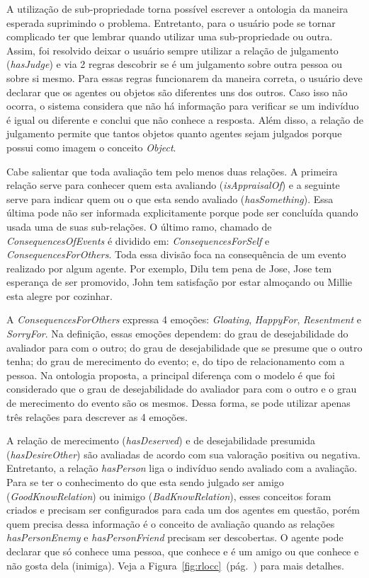 A utilização de sub-propriedade torna possível escrever a ontologia da maneira
esperada suprimindo o problema. Entretanto, para o usuário pode se tornar
complicado ter que lembrar quando utilizar uma sub-propriedade ou outra.
Assim, foi resolvido deixar o usuário sempre utilizar a relação de julgamento
(\emph{hasJudge}) e via 2 regras descobrir se é um julgamento sobre outra
pessoa ou sobre si mesmo. Para essas regras funcionarem da maneira correta,
o usuário deve declarar que os agentes ou objetos são diferentes uns dos
outros. Caso isso não ocorra, o sistema considera que não há informação para
verificar se um indivíduo é igual ou diferente e conclui que não conhece a
resposta. Além disso, a relação de julgamento permite que tantos objetos
quanto agentes sejam julgados porque possui como imagem o conceito
\emph{Object}.

Cabe salientar que toda avaliação tem pelo menos duas relações. A primeira
relação serve para conhecer quem esta avaliando (\emph{isAppraisalOf}) e a
seguinte serve para indicar quem ou o que esta sendo avaliado
(\emph{hasSomething}). Essa última pode não ser informada explicitamente porque pode
ser concluída quando usada uma de suas sub-relações. O último ramo, chamado de
\emph{ConsequencesOfEvents} é dividido em: \emph{ConsequencesForSelf} e
\emph{ConsequencesForOthers}. Toda essa divisão foca na consequência de um
evento realizado por algum agente. Por exemplo, Dilu tem pena
de Jose, Jose tem esperança de ser promovido, John tem satisfação por
estar almoçando ou Millie esta alegre por cozinhar.

A \emph{ConsequencesForOthers} expressa 4 emoções: \emph{Gloating},
\emph{HappyFor}, \emph{Resentment} e \emph{SorryFor}. Na definição, essas
emoções dependem: do grau de desejabilidade do avaliador para com o outro; do
grau de desejabilidade que se presume que o outro tenha; do grau de
merecimento do evento; e, do tipo de relacionamento com a pessoa. Na ontologia
proposta, a principal diferença com o modelo \occ é que foi considerado
que o grau de desejabilidade do avaliador para com o outro e o grau de
merecimento do evento são os mesmos. Dessa forma, se pode utilizar apenas três
relações para descrever as 4 emoções.

A relação de merecimento (\emph{hasDeserved}) e de desejabilidade
presumida (\emph{hasDesireOther}) são avaliadas de acordo com sua valoração
positiva ou negativa. Entretanto, a relação \emph{hasPerson} liga o indivíduo
sendo avaliado com a avaliação. Para se ter o conhecimento do que esta sendo julgado
ser amigo (\emph{GoodKnowRelation}) ou inimigo (\emph{BadKnowRelation}), esses
conceitos foram criados e precisam ser configurados para cada um dos agentes
em questão, porém quem precisa dessa informação é o conceito de avaliação
quando as relações \emph{hasPersonEnemy} e \emph{hasPersonFriend} precisam ser
descobertas. O agente pode declarar que só conhece uma pessoa, que conhece e é
um amigo ou que conhece e não gosta dela (inimiga). Veja a
Figura~\ref{fig:rlocc}~(pág.~\pageref{fig:rlocc}) para mais detalhes.

